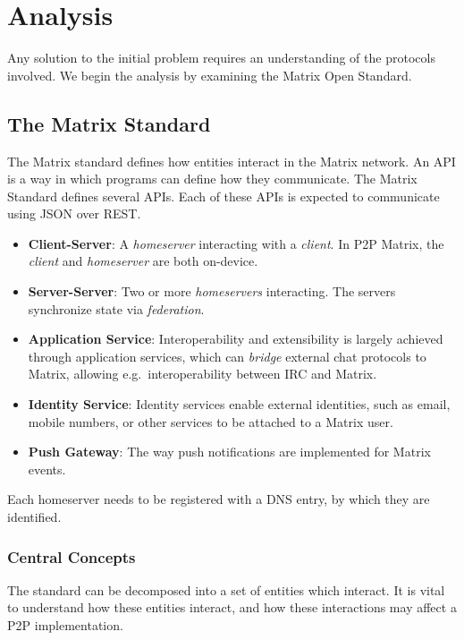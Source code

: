 \chapter{Analysis}
Any solution to the initial problem requires an understanding of the protocols involved.
We begin the analysis by examining the Matrix Open Standard.

\section{The Matrix Standard}
The Matrix standard defines how entities interact in the Matrix network.
An \ac{API} is a way in which programs can define how they communicate.
The Matrix Standard defines several \ac{API}s.
Each of these \ac{API}s is expected to communicate using \ac{JSON} over \ac{REST}.
\begin{itemize}
      \item \textbf{Client-Server}:
            A \textit{homeserver} interacting with a \textit{client}.
            In \ac{P2P} Matrix, the \textit{client} and \textit{homeserver} are both on-device.
      \item \textbf{Server-Server}:
            Two or more \textit{homeservers} interacting.
            The servers synchronize state via \textit{federation}.
      \item \textbf{Application Service}:
            Interoperability and extensibility is largely achieved through application services, which can \textit{bridge} external chat protocols to Matrix, allowing e.g.~interoperability between \ac{IRC} and Matrix.
      \item \textbf{Identity Service}:
            Identity services enable external identities, such as email, mobile numbers, or other services to be attached to a Matrix user.
      \item \textbf{Push Gateway}:
            The way push notifications are implemented for Matrix events.
\end{itemize}

Each homeserver needs to be registered with a \ac{DNS} entry, by which they are identified.

\subsection{Central Concepts}
The standard can be decomposed into a set of entities which interact.
It is vital to understand how these entities interact, and how these interactions may affect a \ac{P2P} implementation.

